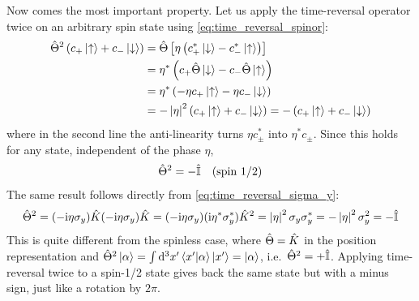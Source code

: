 Now comes the most important property. Let us apply the time-reversal operator twice on an arbitrary spin state using \cref{eq:time_reversal_spinor}:
\begin{align*}
    \hat{\Theta}^2 \left( c_+ \ket{\uparrow} + c_- \ket{\downarrow} \right) &= \hat{\Theta} \left[ \eta \left( c_+^* \ket{\downarrow} - c_-^* \ket{\uparrow} \right) \right] \\
    &= \eta^* \left( c_+ \hat{\Theta} \ket{\downarrow} - c_- \hat{\Theta} \ket{\uparrow} \right) \\
    &= \eta^* \left( - \eta c_+ \ket{\uparrow} - \eta c_- \ket{\downarrow} \right) \\
    &= - \left| \eta \right|^2 \left( c_+ \ket{\uparrow} + c_- \ket{\downarrow} \right) = - \left( c_+ \ket{\uparrow} + c_- \ket{\downarrow} \right)
\end{align*}
where in the second line the anti-linearity turns $\eta c_\pm^*$ into $\eta^* c_\pm$. Since this holds for any state, independent of the phase $\eta$,
\begin{align}
    \hat{\Theta}^2 = - \hat{\mathbb{I}} \quad \text{(spin 1/2)} \label{eq:theta_square_spin_half}
\end{align}
The same result follows directly from \cref{eq:time_reversal_sigma_y}:
\begin{align*}
    \hat{\Theta}^2 = (- \mathrm{i} \eta \sigma_y) \hat{K} (- \mathrm{i} \eta \sigma_y) \hat{K} = (- \mathrm{i} \eta \sigma_y)(\mathrm{i} \eta^* \sigma_y^*) \hat{K}^2 = \left| \eta \right|^2 \sigma_y \sigma_y^* = - \left| \eta \right|^2 \sigma_y^2 = - \hat{\mathbb{I}}
\end{align*}
This is quite different from the spinless case, where $\hat{\Theta} = \hat{K}$ in the position representation and $\hat{\Theta}^2 \ket{\alpha} = \int \mathrm{d}^3 x' \braket{x'|\alpha} \ket{x'} = \ket{\alpha}$, i.e.\ $\hat{\Theta}^2 = + \hat{\mathbb{I}}$. Applying time-reversal twice to a spin-1/2 state gives back the same state but with a minus sign, just like a rotation by $2\pi$.

